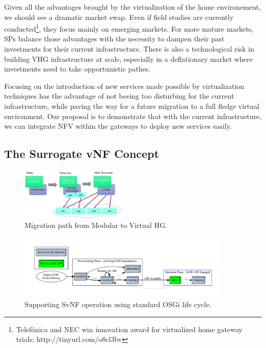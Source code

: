 
Given all the advantages brought by the virtualization of the home environement, we should see a dramatic market swap.
Even if field studies are currently conducted\footnote{Telefónica and NEC win innovation award for virtualized home gateway trials: http://tinyurl.com/o8cl3bv}, they focus mainly on emerging markets.
For more mature markets, SPs balance those advantages with the necessity to dampen their past investments for their current infrastructure.
There is also a technological risk in building VHG infrastructure at scale, especially in a deflationary market where investments need to take opportunistic pathes. 

Focusing on the introduction of new services made possible by virtualization techniques has the advantage of not beeing too disturbing for the current infrastructure, while paving the way for a future migration to a full fledge virtual environment. Our proposal is to demonstrate that with the current infrastrusture, we can integrate NFV within the gateways to deploy new services easily.

\subsection{The Surrogate vNF Concept}
\begin{figure}
  \begin{center}
    \includegraphics[width=0.45\textwidth,natwidth=6000,natheight=4000]{fig/vhgMigrationPath.png}
  \end{center}
  \caption{ Migration path from Modular to Virtual HG.
    \label{fig:migration}
  }
\end{figure}	

\begin{figure}
	
	\center

	\includegraphics[width=0.90\textwidth]{fig/osgi.pdf}
	\caption{ Supporting SvNF operation using standard OSGi life cycle.
    \label{fig:osgisvnf}
    }

\end{figure}
	   


